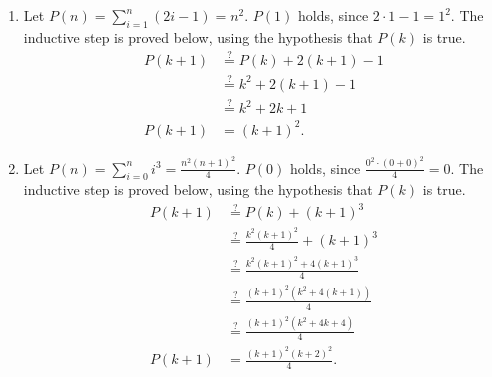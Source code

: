 \documentclass[12pt]{article}
\newcommand{\posseq}{\stackrel{?}{=}}
\begin{document}
\begin{enumerate}
\begin{enumerate}
    \item Let $P(n) = \sum_{i = 1}^{n} (2i - 1) = n^{2}$. $P(1)$ holds, since $2 \cdot 1 - 1 = 1^{2}$. The inductive step is proved below, using the hypothesis that $P(k)$ is true.
    \begin{align*}
      P(k + 1) & \posseq P(k) + 2(k + 1) - 1  \\
               & \posseq k^{2} + 2(k + 1) - 1 \\
               & \posseq k^{2} + 2k + 1       \\
      P(k + 1) & = (k + 1)^{2}.
    \end{align*}
    
    \item Let $P(n) = \sum_{i = 0}^{n} i^{3} = \frac{n^{2} (n + 1)^{2}}{4}$. $P(0)$ holds, since $\tfrac{0^{2} \cdot (0 + 0)^{2}}{4} = 0$. The inductive step is proved below, using the hypothesis that $P(k)$ is true.
    \begin{align*}
      P(k + 1) & \posseq P(k) + (k + 1)^{3}                          \\
               & \posseq \tfrac{k^{2} (k + 1)^{2}}{4} + (k + 1)^{3}  \\
               & \posseq \tfrac{k^{2} (k + 1)^{2} + 4(k + 1)^{3}}{4} \\
               & \posseq \tfrac{(k + 1)^{2}(k^{2} + 4(k + 1))}{4}    \\
               & \posseq \tfrac{(k + 1)^{2}(k^{2} + 4k + 4)}{4}      \\
      P(k + 1) & = \tfrac{(k + 1)^{2}(k + 2)^{2}}{4}.
    \end{align*}
  \end{enumerate}
  

\end{enumerate}
\end{document}

